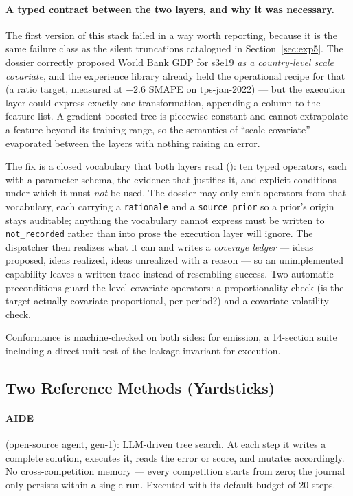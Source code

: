 \documentclass[11pt,a4paper]{article}
\begin{document}
\paragraph{A typed contract between the two layers, and why it was necessary.} The first version of this stack failed in a way worth reporting, because it is the same failure class as the silent truncations catalogued in Section~\ref{sec:exp5}. The dossier correctly proposed World Bank GDP for s3e19 \emph{as a country-level scale covariate}, and the experience library already held the operational recipe for that (a ratio target, measured at $-2.6$ SMAPE on tps-jan-2022) --- but the execution layer could express exactly one transformation, appending a column to the feature list. A gradient-boosted tree is piecewise-constant and cannot extrapolate a feature beyond its training range, so the semantics of ``scale covariate'' evaporated between the layers with nothing raising an error.

The fix is a closed vocabulary that both layers read (): ten typed operators, each with a parameter schema, the evidence that justifies it, and explicit conditions under which it must \emph{not} be used. The dossier may only emit operators from that vocabulary, each carrying a \texttt{rationale} and a \texttt{source\_prior} so a prior's origin stays auditable; anything the vocabulary cannot express must be written to \texttt{not\_recorded} rather than into prose the execution layer will ignore. The dispatcher then realizes what it can and writes a \emph{coverage ledger} --- ideas proposed, ideas realized, ideas unrealized with a reason --- so an unimplemented capability leaves a written trace instead of resembling success. Two automatic preconditions guard the level-covariate operators: a proportionality check (is the target actually covariate-proportional, per period?) and a covariate-volatility check.

Conformance is machine-checked on both sides:  for emission, a 14-section suite including a direct unit test of the leakage invariant for execution.

\subsection{Two Reference Methods (Yardsticks)}

\paragraph{AIDE} (open-source agent, gen-1): LLM-driven tree search. At each step it writes a complete solution, executes it, reads the error or score, and mutates accordingly. No cross-competition memory --- every competition starts from zero; the journal only persists within a single run. Executed with its default budget of 20 steps.
\end{document}
